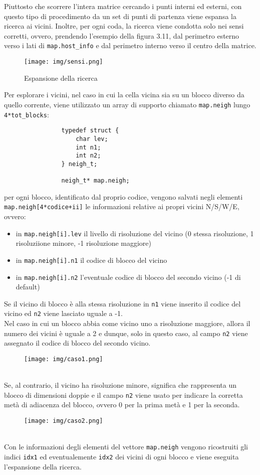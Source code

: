 			Piuttosto che scorrere l'intera matrice cercando i punti interni ed esterni, con questo tipo di procedimento da un set di punti di partenza viene espansa la ricerca ai vicini. Inoltre, per ogni coda, la ricerca viene condotta solo nei sensi corretti, ovvero, prendendo l'esempio della figura 3.11,  dal perimetro esterno verso i lati di \texttt{map.host\_info} e dal perimetro interno verso il centro della matrice.
			\begin{figure}[htbp]
				\centering
				\texttt{[image: img/sensi.png]}
				\caption{Espansione della ricerca}
			\end{figure}

			Per esplorare i vicini, nel caso in cui la cella vicina sia su un blocco diverso da quello corrente, viene utilizzato un array di supporto chiamato \texttt{map.neigh} lungo \texttt{4*tot\_blocks}:
			\begin{verbatim}
				typedef struct {
				    char lev;
				    int n1;
				    int n2;
				} neigh_t;

				neigh_t* map.neigh;
			\end{verbatim}
			per ogni blocco, identificato dal proprio codice, vengono salvati negli elementi \texttt{map.neigh[4*codice+ii]} le informazioni relative ai propri vicini N/S/W/E, ovvero:
			\begin{itemize}
				\item in \texttt{map.neigh[i].lev} il livello di risoluzione del vicino (0 stessa risoluzione, 1 risoluziione minore, -1 risoluzione maggiore)
				\item in \texttt{map.neigh[i].n1} il codice di blocco del vicino
				\item in \texttt{map.neigh[i].n2} l'eventuale codice di blocco del secondo vicino (-1 di default)
			\end{itemize}
			Se il vicino di blocco \`{e} alla stessa risoluzione in \texttt{n1} viene inserito il codice del vicino ed \texttt{n2} viene lasciato uguale a -1.\\
			Nel caso in cui un blocco abbia come vicino uno a risoluzione maggiore, allora il numero dei vicini \`{e} uguale a 2 e dunque, solo in questo caso, al campo \texttt{n2} viene assegnato il codice di blocco del secondo vicino. 
			\begin{figure}[htbp]
				\centering
				\texttt{[image: img/caso1.png]}
			\end{figure}\\
			Se, al contrario, il vicino ha risoluzione minore, significa che rappresenta un blocco di dimensioni doppie e il campo \texttt{n2} viene usato per indicare la corretta met\`{a} di adiacenza del blocco, ovvero 0 per la prima met\`{a} e 1 per la seconda.
			\begin{figure}[htbp]
				\centering
				\texttt{[image: img/caso2.png]}
			\end{figure}\\  
			Con le informazioni degli elementi del vettore \texttt{map.neigh} vengono ricostruiti gli indici \texttt{idx1} ed eventualemente \texttt{idx2} dei vicini di ogni blocco e viene eseguita l'espansione della ricerca.


